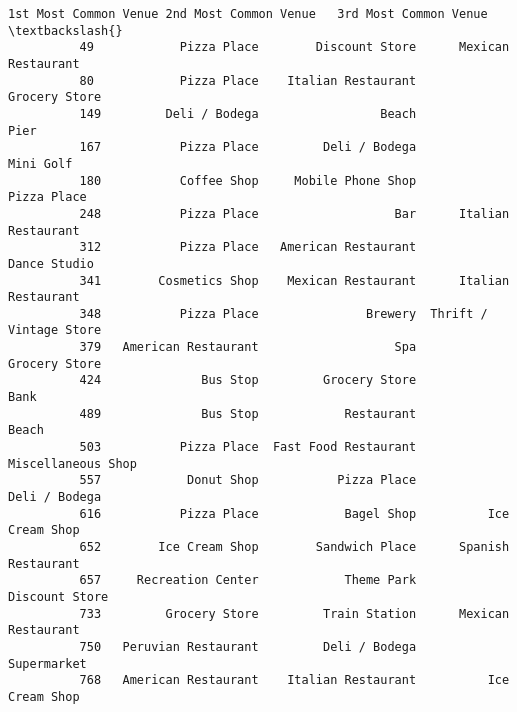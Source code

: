\documentclass[11pt]{article}
\begin{document}
\begin{Verbatim}[commandchars=\\\{\}]
              1st Most Common Venue 2nd Most Common Venue   3rd Most Common Venue  \textbackslash{}
          49            Pizza Place        Discount Store      Mexican Restaurant   
          80            Pizza Place    Italian Restaurant           Grocery Store   
          149         Deli / Bodega                 Beach                    Pier   
          167           Pizza Place         Deli / Bodega               Mini Golf   
          180           Coffee Shop     Mobile Phone Shop             Pizza Place   
          248           Pizza Place                   Bar      Italian Restaurant   
          312           Pizza Place   American Restaurant            Dance Studio   
          341        Cosmetics Shop    Mexican Restaurant      Italian Restaurant   
          348           Pizza Place               Brewery  Thrift / Vintage Store   
          379   American Restaurant                   Spa           Grocery Store   
          424              Bus Stop         Grocery Store                    Bank   
          489              Bus Stop            Restaurant                   Beach   
          503           Pizza Place  Fast Food Restaurant      Miscellaneous Shop   
          557            Donut Shop           Pizza Place           Deli / Bodega   
          616           Pizza Place            Bagel Shop          Ice Cream Shop   
          652        Ice Cream Shop        Sandwich Place      Spanish Restaurant   
          657     Recreation Center            Theme Park          Discount Store   
          733         Grocery Store         Train Station      Mexican Restaurant   
          750   Peruvian Restaurant         Deli / Bodega             Supermarket   
          768   American Restaurant    Italian Restaurant          Ice Cream Shop   
          

\end{Verbatim}
\end{document}
